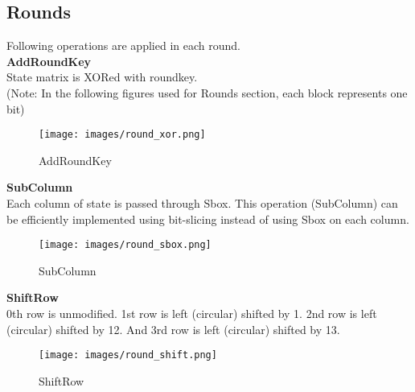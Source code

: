 \documentclass[final]{transcrypto}
\begin{document}
\subsection{Rounds}
\label{Rounds}
Following operations are applied in each round.\\
\textbf{AddRoundKey}\\
State matrix is XORed with roundkey.\\
(Note: In the following figures used for Rounds section, each block represents one bit)
\begin{figure}[H]
\caption{AddRoundKey}
\centering
\texttt{[image: images/round\_xor.png]}
\end{figure}
\hspace*{-0.64cm} \textbf{SubColumn}\\
Each column of state is passed through Sbox. This operation (SubColumn) can be efficiently implemented using bit-slicing instead of using Sbox on each column.\\
\begin{figure}[H]
\caption{SubColumn}
\centering
\texttt{[image: images/round\_sbox.png]}
\end{figure}
\hspace*{-0.5cm}\textbf{ShiftRow}\\
0th row is unmodified. 1st row is left (circular) shifted by 1. 2nd row is left (circular) shifted by 12. And 3rd row is left (circular) shifted by 13.\\
\begin{figure}[H]
\caption{ShiftRow}
\centering
\texttt{[image: images/round\_shift.png]}
\end{figure}
\end{document}
